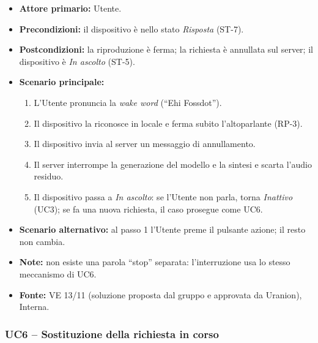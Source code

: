 \documentclass[12pt,a4paper]{article}
\newcommand{\tightlist}{\setlength{\itemsep}{1pt}\setlength{\parskip}{0pt}}
\begin{document}
\begin{itemize}

\tightlist

\item \textbf{Attore primario:} Utente.

\item \textbf{Precondizioni:} il dispositivo è nello stato \emph{Risposta} (ST-7).

\item \textbf{Postcondizioni:} la riproduzione è ferma; la richiesta è annullata sul server; il dispositivo è \emph{In ascolto} (ST-5).

\item \textbf{Scenario principale:}

\begin{enumerate}

\tightlist

\item L'Utente pronuncia la \emph{wake word} (``Ehi Fossdot'').

\item Il dispositivo la riconosce in locale e ferma subito l'altoparlante (RP-3).

\item Il dispositivo invia al server un messaggio di annullamento.

\item Il server interrompe la generazione del modello e la sintesi e scarta l'audio residuo.

\item Il dispositivo passa a \emph{In ascolto}: se l'Utente non parla, torna \emph{Inattivo} (UC3); se fa una nuova richiesta, il caso prosegue come UC6.

\end{enumerate}

\item \textbf{Scenario alternativo:} al passo 1 l'Utente preme il pulsante azione; il resto non cambia.

\item \textbf{Note:} non esiste una parola ``stop'' separata: l'interruzione usa lo stesso meccanismo di UC6.

\item \textbf{Fonte:} VE 13/11 (soluzione proposta dal gruppo e approvata da Uranion), Interna.

\end{itemize}



\subsubsection{UC6 -- Sostituzione della richiesta in corso}
\end{document}
